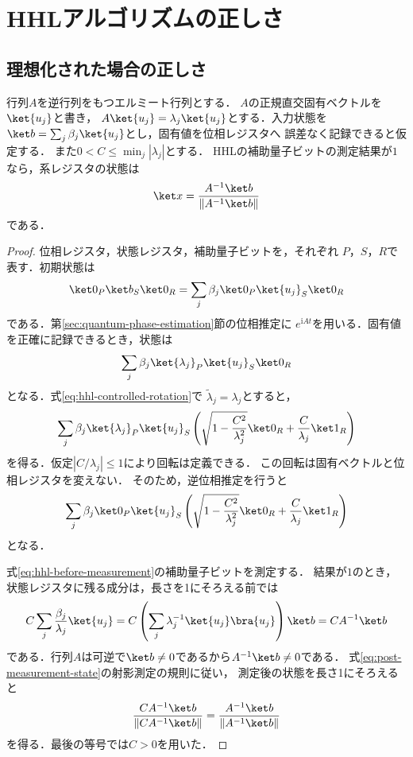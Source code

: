 \section{HHLアルゴリズムの正しさ}
\label{sec:hhl-correctness}

\subsection{理想化された場合の正しさ}

\begin{theo}[理想HHLの正しさ]
\label{thm:hhl-correctness}
行列$A$を逆行列をもつエルミート行列とする．
$A$の正規直交固有ベクトルを$\ket{u_j}$と書き，
$A\ket{u_j}=\lambda_j\ket{u_j}$とする．入力状態を
$\ket b=\sum_j\beta_j\ket{u_j}$とし，固有値を位相レジスタへ
誤差なく記録できると仮定する．
また$0<C\leq\min_j|\lambda_j|$とする．
HHLの補助量子ビットの測定結果が$1$なら，系レジスタの状態は
\begin{equation}
 \ket x=\frac{A^{-1}\ket b}{\lVert A^{-1}\ket b\rVert}
 \label{eq:hhl-correct-output}
\end{equation}
である．
\end{theo}

\begin{proof}
位相レジスタ，状態レジスタ，補助量子ビットを，それぞれ
$P$，$S$，$R$で表す．初期状態は
\[
 \ket0_P\ket b_S\ket0_R
 =\sum_j\beta_j\ket0_P\ket{u_j}_S\ket0_R
\]
である．第\ref{sec:quantum-phase-estimation}節の位相推定に
$e^{\mathrm{i}At}$を用いる．固有値を正確に記録できるとき，状態は
\[
 \sum_j\beta_j\ket{\lambda_j}_P\ket{u_j}_S\ket0_R
\]
となる．式\eqref{eq:hhl-controlled-rotation}で
$\widetilde{\lambda}_j=\lambda_j$とすると，
\[
 \sum_j\beta_j\ket{\lambda_j}_P\ket{u_j}_S
 \left(
  \sqrt{1-\frac{C^2}{\lambda_j^2}}\ket0_R
  +\frac{C}{\lambda_j}\ket1_R
 \right)
\]
を得る．仮定$|C/\lambda_j|\leq1$により回転は定義できる．
この回転は固有ベクトルと位相レジスタを変えない．
そのため，逆位相推定を行うと
\begin{equation}
 \sum_j\beta_j\ket0_P\ket{u_j}_S
 \left(
  \sqrt{1-\frac{C^2}{\lambda_j^2}}\ket0_R
  +\frac{C}{\lambda_j}\ket1_R
 \right)
 \label{eq:hhl-before-measurement}
\end{equation}
となる．

式\eqref{eq:hhl-before-measurement}の補助量子ビットを測定する．
結果が$1$のとき，状態レジスタに残る成分は，長さを1にそろえる前では
\[
 C\sum_j\frac{\beta_j}{\lambda_j}\ket{u_j}
 =C\left(\sum_j\lambda_j^{-1}\ket{u_j}\bra{u_j}\right)\ket b
 =CA^{-1}\ket b
\]
である．行列$A$は可逆で$\ket b\ne0$であるから$A^{-1}\ket b\ne0$である．
式\eqref{eq:post-measurement-state}の射影測定の規則に従い，
測定後の状態を長さ1にそろえると
\[
 \frac{CA^{-1}\ket b}{\lVert CA^{-1}\ket b\rVert}
 =\frac{A^{-1}\ket b}{\lVert A^{-1}\ket b\rVert}
\]
を得る．最後の等号では$C>0$を用いた．
\end{proof}
